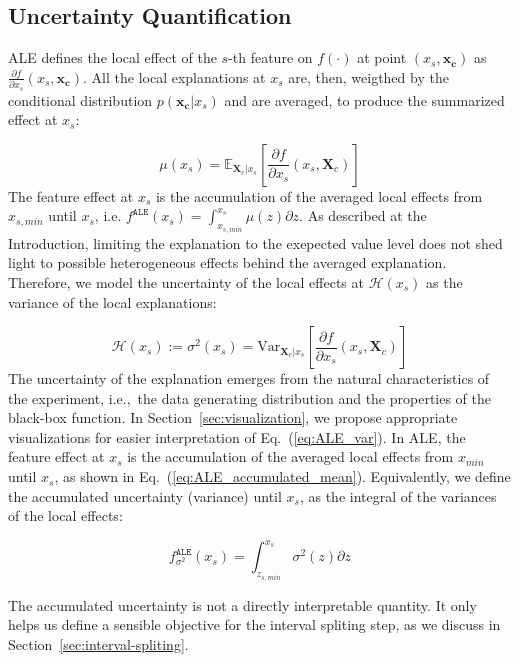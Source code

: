 \documentclass[twoside]{article}
\newcommand{\dfdx}{\frac{\partial f}{\partial x_s}}
\newcommand{\xc}{\mathbf{x_c}}
\newcommand{\Xcb}{\mathbf{X}_c}
\begin{document}
\subsection{Uncertainty Quantification}
\label{sec:NAME-definition}

ALE defines the local effect of the \(s\)-th feature on \(f(\cdot)\)
at point \((x_s, \xc)\) as \(\dfdx (x_s, \xc)\). All the local
explanations at \(x_s\) are, then, weigthed by the conditional
distribution \(p(\xc|x_s)\) and are averaged, to produce the
summarized effect at \(x_s\):

\begin{equation}
  \label{eq:ALE_mean}
  \mu(x_s) = \mathbb{E}_{\Xcb|x_s}\left [\dfdx (x_s, \Xcb)\right ]
\end{equation}
%
The feature effect at \(x_s\) is the accumulation of the averaged
local effects from \(x_{s, min}\) until \(x_s\), i.e.
\(f^{\mathtt{ALE}}(x_s) = \int_{x_{s, min}}^{x_s} \mu(z) \partial z
\). As described at the Introduction, limiting the explanation to the
exepected value level does not shed light to possible heterogeneous
effects behind the averaged explanation. Therefore, we model the
uncertainty of the local effects at \(\mathcal{H}(x_s)\) as the
variance of the local explanations:

\begin{equation}
  \label{eq:ALE_var}
  \mathcal{H}(x_s) := \sigma^2(x_s) = \mathrm{Var}_{\Xcb|x_s}\left [\dfdx (x_s, \Xcb) \right ]
\end{equation}
\noindent
The uncertainty of the explanation emerges from the natural
characteristics of the experiment, i.e.,~the data generating
distribution and the properties of the black-box function. In
Section~\ref{sec:visualization}, we propose appropriate visualizations
for easier interpretation of Eq.~(\ref{eq:ALE_var}). In ALE, the
feature effect at \(x_s\) is the accumulation of the averaged local
effects from \(x_{min}\) until \(x_s\), as shown in
Eq.~(\ref{eq:ALE_accumulated_mean}). Equivalently, we define the
accumulated uncertainty (variance) until \(x_s\), as the integral of
the variances of the local effects:

\begin{equation}
  \label{eq:ALE_accumulated_var}
  f^{\mathtt{ALE}}_{\sigma^2}(x_s) = \int_{z_{s, min}}^{x_s} \sigma^2(z) \partial z
\end{equation}
\noindent

The accumulated uncertainty is not a directly interpretable
quantity. It only helps us define a sensible objective for the
interval spliting step, as we discuss in
Section~\ref{sec:interval-spliting}.
\end{document}

